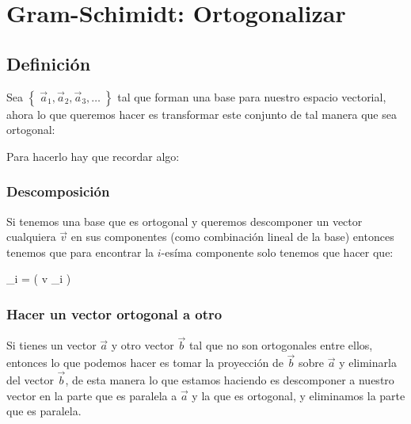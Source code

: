 \documentclass[12pt, fleqn]{report}                             %
\makeatletter
\def \Eq {equation}                                             %
\newenvironment{MultiLineEquation*}[1]                          %
        {\begin{\Eq*}\begin{alignedat}{#1}}                         %
        {\end{alignedat}\end{\Eq*}}                                 %
\theoremstyle{break}                                            %
\newcommand{\Set}[1]            {\left\{ \; #1 \; \right\}}     %
\newcommand{\Wrap}[1]           {\left( #1 \right)}             %
\newcommand*\dotP{\mathpalette\dotP@{.5}}                       %
\newcommand*\dotP@[2] {\mathbin {                               %
        \vcenter{\hbox{\scalebox{#2}{$\m@th#1\bullet$}}}}           %
    }                                                               %
\newcommand{\cdotP}[2] {\Wrap{ #1 \dotP #2 } }                  %
\makeatother
\begin{document}
    \chapter{Gram-Schimidt: Ortogonalizar}
  
        \clearpage
        \section{Definición}

            Sea $\Set{\vec a_1, \vec a_2, \vec a_3, \dots}$ tal que forman una base
            para nuestro espacio vectorial, ahora lo que queremos hacer es transformar 
            este conjunto de tal manera que sea ortogonal:
            
            Para hacerlo hay que recordar algo:
            
            \subsection{Descomposición}

                Si tenemos una base que es ortogonal y queremos descomponer un vector
                cualquiera $\vec v$ en sus componentes (como combinación lineal de la base)
                entonces tenemos que para encontrar la $i$-esíma componente solo tenemos que hacer
                que:
                \begin{MultiLineEquation*}{3}
                    \alpha_i = \dfrac{1}{ \cdotP{e_i}{e_i} } \cdotP{\vec v}{e_i}
                \end{MultiLineEquation*}
                
            \subsection{Hacer un vector ortogonal a otro}

                Si tienes un vector $\vec a$ y otro vector $\vec b$ tal que no son
                ortogonales entre ellos, entonces lo que podemos hacer es tomar la proyección
                de $\vec b$ sobre $\vec a$ y eliminarla del vector $\vec b$, de esta manera
                lo que estamos haciendo es descomponer a nuestro vector en la parte que es
                paralela a $\vec a$ y la que es ortogonal, y eliminamos la parte que es paralela.
\end{document}
